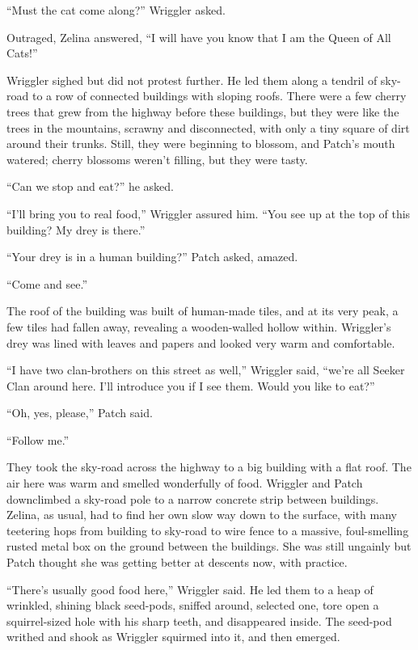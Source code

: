\documentclass[ebook,oneside,openany,17pt]{memoir}
\newenvironment{tolerant}[1]{%
  \par\tolerance=#1\relax
}{%
  \par
}
\begin{document}
“Must the cat come along?” Wriggler asked.

Outraged, Zelina answered, “I will have you know that I am the Queen
of All Cats!”

Wriggler sighed but did not protest further. He led them along a
tendril of sky-road to a row of connected buildings with sloping
roofs. There were a few cherry trees that grew from the highway before
these buildings, but they were like the trees in the mountains,
scrawny and disconnected, with only a tiny square of dirt around their
trunks. Still, they were beginning to blossom, and Patch’s mouth
watered; cherry blossoms weren’t filling, but they were tasty.

“Can we stop and eat?” he asked.

“I’ll bring you to real food,” Wriggler assured him. “You see up at
the top of this building? My drey is there.”

“Your drey is in a human building?” Patch asked, amazed.

“Come and see.”

The roof of the building was built of human-made tiles, and at its
very peak, a few tiles had fallen away, revealing a wooden-walled
hollow within. Wriggler’s drey was lined with leaves and papers and
looked very warm and comfortable.

“I have two clan-brothers on this street as well,” Wriggler said,
“we’re all Seeker Clan around here. I’ll introduce you if I see
them. Would you like to eat?”

“Oh, yes, please,” Patch said.

“Follow me.”

\begin{tolerant}{500}
They took the sky-road across the highway to a big building with a
flat roof. The air here was warm and smelled wonderfully of
food. Wriggler and Patch downclimbed a sky-road pole to a narrow
concrete strip between buildings. Zelina, as usual, had to find her
own slow way down to the surface, with many teetering hops from
building to sky-road to wire fence to a massive, foul-smelling rusted
metal box on the ground between the buildings. She was still ungainly
but Patch thought she was getting better at descents now, with
practice.
\end{tolerant}

“There’s usually good food here,” Wriggler said. He led them to a heap
of wrinkled, shining black seed-pods, sniffed around, selected one,
tore open a squirrel-sized hole with his sharp teeth, and disappeared
inside. The seed-pod writhed and shook as Wriggler squirmed into it,
and then emerged.
\end{document}
